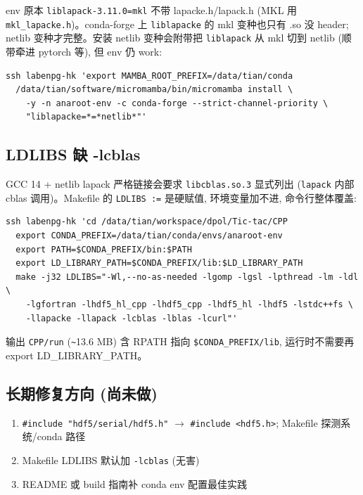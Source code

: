 \documentclass[11pt,a4paper]{article}
\begin{document}
env 原本 \texttt{liblapack-3.11.0=mkl} 不带 lapacke.h/lapack.h
(MKL 用 \texttt{mkl\_lapacke.h})。conda-forge 上 \texttt{liblapacke} 的 mkl
变种也只有 .so 没 header; netlib 变种才完整。安装 netlib 变种会附带把
\texttt{liblapack} 从 mkl 切到 netlib (顺带牵进 pytorch 等), 但 env 仍 work:

\begin{lstlisting}
ssh labenpg-hk 'export MAMBA_ROOT_PREFIX=/data/tian/conda
  /data/tian/software/micromamba/bin/micromamba install \
    -y -n anaroot-env -c conda-forge --strict-channel-priority \
    "liblapacke=*=*netlib*"'
\end{lstlisting}

\subsection{LDLIBS 缺 -lcblas}

GCC 14 + netlib lapack 严格链接会要求 \texttt{libcblas.so.3} 显式列出
(\texttt{lapack} 内部 cblas 调用)。Makefile 的 \texttt{LDLIBS :=} 是硬赋值,
环境变量加不进, 命令行整体覆盖:

\begin{lstlisting}
ssh labenpg-hk 'cd /data/tian/workspace/dpol/Tic-tac/CPP
  export CONDA_PREFIX=/data/tian/conda/envs/anaroot-env
  export PATH=$CONDA_PREFIX/bin:$PATH
  export LD_LIBRARY_PATH=$CONDA_PREFIX/lib:$LD_LIBRARY_PATH
  make -j32 LDLIBS="-Wl,--no-as-needed -lgomp -lgsl -lpthread -lm -ldl \
    -lgfortran -lhdf5_hl_cpp -lhdf5_cpp -lhdf5_hl -lhdf5 -lstdc++fs \
    -llapacke -llapack -lcblas -lblas -lcurl"'
\end{lstlisting}

输出 \texttt{CPP/run} (\texttt{\textasciitilde}13.6 MB) 含 RPATH 指向
\texttt{\$CONDA\_PREFIX/lib}, 运行时不需要再 export LD\_LIBRARY\_PATH。

\subsection{长期修复方向 (尚未做)}

\begin{enumerate}[itemsep=2pt]
\item \verb|#include "hdf5/serial/hdf5.h"| $\to$ \verb|#include <hdf5.h>|; Makefile 探测系统/conda 路径
\item Makefile LDLIBS 默认加 \texttt{-lcblas} (无害)
\item README 或 build 指南补 conda env 配置最佳实践
\end{enumerate}
\end{document}
